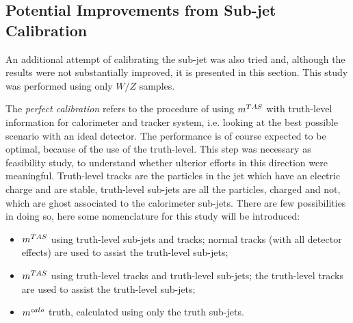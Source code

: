 \subsection{Potential Improvements from Sub-jet Calibration}

An additional attempt of calibrating the sub-jet was also tried and, although the results were not substantially improved, it is presented in this section. This study was performed using only $W/Z$ samples.

The \textit{perfect calibration} refers to the procedure of using $m^{TAS}$ with truth-level information for calorimeter and tracker system, i.e. looking at the best possible scenario with an ideal detector. The performance is of course expected to be optimal, because of the use of the truth-level. This step was necessary as feasibility study, to understand whether ulterior efforts in this direction were meaningful.
Truth-level tracks are the particles in the jet which have an electric charge and are stable, truth-level sub-jets are all the particles, charged and not, which are ghost associated to the calorimeter sub-jets.
There are few possibilities in doing so, here some nomenclature for this study will be introduced:
\begin{itemize}
 \item $m^{TAS}$ using truth-level sub-jets and tracks; normal tracks (with all detector effects) are used to assist the truth-level sub-jets;
 \item $m^{TAS}$ using truth-level tracks and truth-level sub-jets; the truth-level tracks are used to assist the truth-level sub-jets;
 \item $m^{calo}$ truth, calculated using only the truth sub-jets.
\end{itemize}






